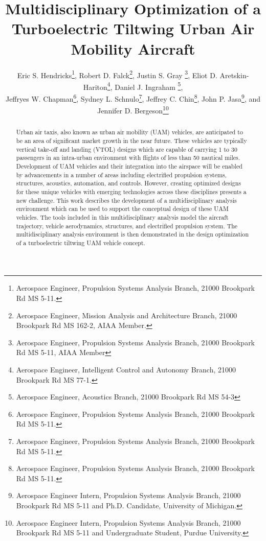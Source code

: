 \documentclass[conf]{new-aiaa}
\title{Multidisciplinary Optimization of a Turboelectric Tiltwing Urban Air Mobility Aircraft}
\author{Eric S. Hendricks\footnote{Aerospace Engineer, Propulsion Systems Analysis Branch, 21000 Brookpark Rd MS 5-11.}, Robert D. Falck\footnote{Aerospace Engineer, Mission Analysis and Architecture Branch, 21000 Brookpark Rd MS 162-2, AIAA Member.}, Justin S. Gray \footnote{Aerospace Engineer, Propulsion Systems Analysis Branch, 21000 Brookpark Rd MS 5-11, AIAA Member}, Eliot D. Aretskin-Hariton\footnote{Aerospace Engineer, Intelligent Control and Autonomy Branch, 21000 Brookpark Rd MS 77-1.}, Daniel J. Ingraham \footnote{Aerospace Engineer, Acoustics Branch, 21000 Brookpark Rd MS 54-3}, \\ Jeffryes W. Chapman\footnote{Aerospace Engineer, Propulsion Systems Analysis Branch, 21000 Brookpark Rd MS 5-11.}, Sydney L. Schnulo\footnote{Aerospace Engineer, Propulsion Systems Analysis Branch, 21000 Brookpark Rd MS 5-11.}, Jeffrey C. Chin\footnote{Aerospace Engineer, Propulsion Systems Analysis Branch, 21000 Brookpark Rd MS 5-11.}, John P. Jasa\footnote{Aerospace Engineer Intern, Propulsion Systems Analysis Branch, 21000 Brookpark Rd MS 5-11 and Ph.D. Candidate, University of Michigan.}, and Jennifer D. Bergeson\footnote{Aerospace Engineer Intern, Propulsion Systems Analysis Branch, 21000 Brookpark Rd MS 5-11 and Undergraduate Student, Purdue University.}}
\affil{NASA Glenn Research Center, Cleveland, OH, 44135}
\begin{document}
\maketitle









%



\begin{abstract}
Urban air taxis, also known as urban air mobility (UAM) vehicles, are anticipated to be an area of significant market growth in the near future.
These vehicles are typically vertical take-off and landing (VTOL) designs which are capable of carrying 1 to 30 passengers in an intra-urban environment with flights of less than 50 nautical miles.
Development of UAM vehicles and their integration into the airspace will be enabled by advancements in a number of areas including electrified propulsion systems, structures, acoustics, automation, and controls.
However, creating optimized designs for these unique vehicles with emerging technologies across these disciplines presents a new challenge.
This work describes the development of a multidisciplinary analysis environment which can be used to support the conceptual design of these UAM vehicles.
The tools included in this multidisciplinary analysis model the aircraft trajectory, vehicle aerodynamics, structures,  and electrified propulsion system.
The multidisciplinary analysis environment is then demonstrated in the design optimization of a turboelectric tiltwing UAM vehicle concept.
\end{abstract}

\end{document}
